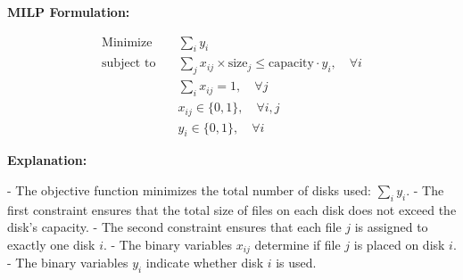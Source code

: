 \documentclass{article}
\begin{document}
\textbf{MILP Formulation:}

\begin{align*}
    \text{Minimize} \quad & \sum_{i} y_i \\
    \text{subject to} \quad & \sum_{j} x_{ij} \times \text{size}_j \leq \text{capacity} \cdot y_i, \quad \forall i \\
    & \sum_{i} x_{ij} = 1, \quad \forall j \\
    & x_{ij} \in \{0, 1\}, \quad \forall i, j \\
    & y_i \in \{0, 1\}, \quad \forall i
\end{align*}

\textbf{Explanation:}

- The objective function minimizes the total number of disks used: \(\sum_{i} y_i\).
- The first constraint ensures that the total size of files on each disk does not exceed the disk's capacity. 
- The second constraint ensures that each file \( j \) is assigned to exactly one disk \( i \).
- The binary variables \( x_{ij} \) determine if file \( j \) is placed on disk \( i \).
- The binary variables \( y_i \) indicate whether disk \( i \) is used.
\end{document}
